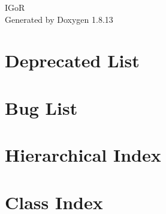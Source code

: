 \documentclass[twoside]{book}
\newcommand{\+}{\discretionary{\mbox{\scriptsize$\hookleftarrow$}}{}{}}
\newcommand{\clearemptydoublepage}{%
  \newpage{\pagestyle{empty}\cleardoublepage}%
}
\begin{document}
\hypersetup{pageanchor=false,
             bookmarksnumbered=true,
             pdfencoding=unicode
            }
\begin{titlepage}
\vspace*{7cm}
\begin{center}%
{\Large I\+GoR }\\
\vspace*{1cm}
{\large Generated by Doxygen 1.8.13}\\
\end{center}
\end{titlepage}
\clearemptydoublepage
{}
\tableofcontents
\clearemptydoublepage
{}
\hypersetup{pageanchor=true}

\chapter{Deprecated List}
\label{deprecated}

\chapter{Bug List}
\label{bug}

\chapter{Hierarchical Index}

\chapter{Class Index}

\end{document}
